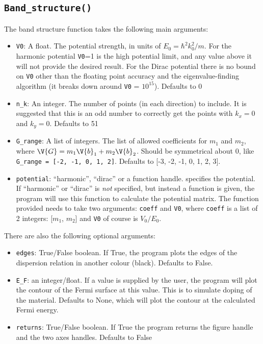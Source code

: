 \documentclass[a4paper,11pt]{article}
\numberwithin{equation}{section}
\begin{document}
	\subsection{\texorpdfstring{\texttt{Band\_structure()}}{Band Structure}}
	The band structure function takes the following main arguments:
	\begin{itemize}
		\item \texttt{V0}: A float. The potential strength, in units of $ E_0 = \hbar^2 k_0^2/m $. For the harmonic potential \texttt{V0}=1 is the high potential limit, and any value above it will not provide the desired result. For the Dirac potential there is no bound on \texttt{V0} other than the floating point accuracy and the eigenvalue-finding algorithm (it breaks down around \texttt{V0} = $ 10^{15} $). Defaults to 0
		\item \texttt{n\_k}: An integer. The number of points (in each direction) to include. It is suggested that this is an odd number to correctly get the points with $ k_x = 0 $ and $ k_y = 0 $. Defaults to 51
		\item \texttt{G\_range}: A list of integers. The list of allowed coefficients for $ m_1 $ and $ m_2 $, where $ \V{G} = m_1 \V{b}_1 + m_2 \V{b}_2 $. Should be symmetrical about 0, like \texttt{G\_range = [-2, -1, 0, 1, 2]}. Defaults to [-3, -2, -1, 0, 1, 2, 3].
		\item \texttt{potential}: ``harmonic'', ``dirac'' or a function handle. specifies the potential. If ``harmonic'' or ``dirac'' is \textit{not} specified, but instead a function is given, the program will use this function to calculate the potential matrix. The function provided needs to take two arguments: \texttt{coeff} and \texttt{V0}, where \texttt{coeff} is a list of 2 integers: [$ m_1 $, $ m_2 $] and \texttt{V0} of course is $ V_0/E_0 $.
	\end{itemize}
	There are also the following optional arguments:
	\begin{itemize}
		\item \texttt{edges}: True/False boolean. If True, the program plots the edges of the dispersion relation in another colour (black). Defaults to False.
		\item \texttt{E\_F}: an integer/float. If a value is supplied by the user, the program will plot the contour of the Fermi surface at this value. This is to simulate doping of the material. Defaults to None, which will plot the contour at the calculated Fermi energy.
		\item \texttt{returns}: True/False boolean. If True the program returns the figure handle and the two axes handles. Defaults to False
	\end{itemize}
\end{document}
